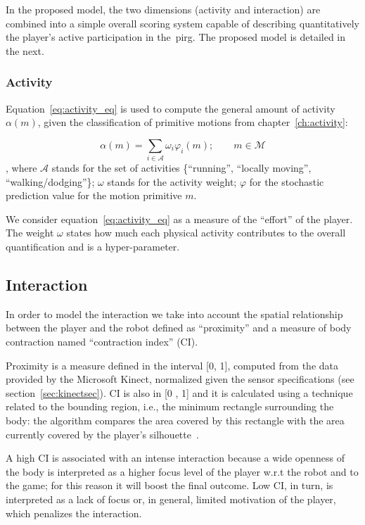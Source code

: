 In the proposed model, the two dimensions (activity and interaction) are combined into a simple overall scoring system capable of describing quantitatively the player's active participation in the~\gls{pirg}. The proposed model is detailed in the next.

\subsubsection{Activity}\label{activity}

Equation~\ref{eq:activity_eq} is used to compute the general amount of activity $\alpha(m)$, given the classification of primitive motions from chapter~\ref{ch:activity}:

\begin{equation}
	\alpha(m)=\sum_{i \in \mathcal{A}} \omega_{i}\varphi_i(m);\qquad m \in \mathcal{M}
	\label{eq:activity_eq}
\end{equation}
, where $\mathcal{A}$ stands for the set of activities \{``running'', ``locally moving'', ``walking/dodging''\}; $\omega$ stands for the activity weight; $\varphi$ for the stochastic prediction value for the motion primitive $m$.

We consider equation~\ref{eq:activity_eq} as a measure of the ``effort'' of the player. The weight $\omega$ states how much each physical activity contributes to the overall quantification and is a hyper-parameter.

\subsection{Interaction}\label{Interaction}
In order to model the interaction we take into account the spatial relationship between the player and the robot defined as ``proximity'' and a measure of body contraction named ``contraction index'' (CI).

Proximity is a measure defined in the interval [0, 1], computed from the data provided by the Microsoft Kinect\textsuperscript{\textregistered}, normalized given the sensor specifications (see section~\ref{sec:kinectsec}). CI is also in [0 , 1] and it is calculated using a technique related to the bounding region, i.e., the minimum rectangle surrounding the body: the algorithm compares the area covered by this rectangle with the area currently covered by the player's silhouette~\cite{castellano_recognising_2007}.

A high CI is associated with an intense interaction because a wide openness of the body is interpreted as a higher focus level of the player w.r.t the robot and to the game; for this reason it will boost the final outcome. Low CI, in turn, is interpreted as a lack of focus or, in general, limited motivation of the player, which penalizes the interaction. %

